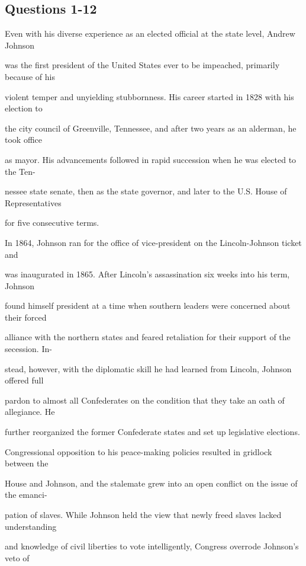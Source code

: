 \documentclass[12pt]{article}
\begin{document}
\subsection*{Questions 1-12}
\begingroup
\small
\sloppy
\setlength{\parskip}{0pt}
\setlength{\parindent}{0pt}
Even with his diverse experience as an elected official at the state level, Andrew Johnson\par
was the first president of the United States ever to be impeached, primarily because of his\par
violent temper and unyielding stubbornness. His career started in 1828 with his election to\par
the city council of Greenville, Tennessee, and after two years as an alderman, he took office\par
as mayor. His advancements followed in rapid succession when he was elected to the Ten-\par
nessee state senate, then as the state governor, and later to the U.S. House of Representatives\par
for five consecutive terms.\par
In 1864, Johnson ran for the office of vice-president on the Lincoln-Johnson ticket and\par
was inaugurated in 1865. After Lincoln's assassination six weeks into his term, Johnson\par
found himself president at a time when southern leaders were concerned about their forced\par
alliance with the northern states and feared retaliation for their support of the secession. In-\par
stead, however, with the diplomatic skill he had learned from Lincoln, Johnson offered full\par
pardon to almost all Confederates on the condition that they take an oath of allegiance. He\par
further reorganized the former Confederate states and set up legislative elections.\par
Congressional opposition to his peace-making policies resulted in gridlock between the\par
House and Johnson, and the stalemate grew into an open conflict on the issue of the emanci-\par
pation of slaves. While Johnson held the view that newly freed slaves lacked understanding\par
and knowledge of civil liberties to vote intelligently, Congress overrode Johnson's veto of\par
\end{document}
